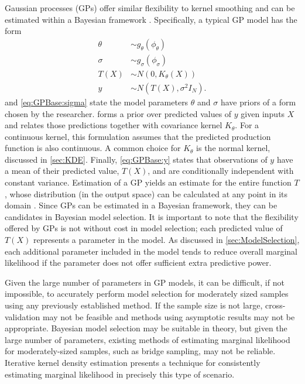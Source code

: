 \documentclass[twocolumn]{article}
\begin{document}
Gaussian processes (GPs) offer similar flexibility to kernel smoothing and can be estimated within a Bayesian framework \citep{Rasmussen}. Specifically, a typical GP model has the form
\begin{subequations}
\begin{align}
	\label{eq:GPBase:theta} \theta &\sim g_\theta(\phi_\theta)\\ 
	\label{eq:GPBase:sigma} \sigma &\sim g_\sigma(\phi_\sigma)\\ 
	\label{eq:GPBase:f} T(X) &\sim N(0, K_\theta(X))\\ 
	\label{eq:GPBase:y} y &\sim N(T(X), \sigma^2 I_N). 
\end{align}
\end{subequations}
 and \cref{eq:GPBase:sigma} state the model parameters $\theta$ and $\sigma$ have priors of a form chosen by the researcher.  forms a prior over predicted values of $y$ given inputs $X$ and relates those predictions together with covariance kernel $K_\theta$. For a continuous kernel, this formulation assumes that the predicted production function is also continuous. A common choice for $K_\theta$ is the normal kernel, discussed in \cref{sec:KDE}. Finally, \cref{eq:GPBase:y} states that observations of $y$ have a mean of their predicted value, $T(X)$, and are conditionally independent with constant variance. Estimation of a GP yields an estimate for the entire function $T$, whose distribution (in the output space) can be calculated at any point in its domain \citep{RasmussenWilliams}. Since GPs can be estimated in a Bayesian framework, they can be candidates in Bayesian model selection. It is important to note that the flexibility offered by GPs is not without cost in model selection; each predicted value of $T(X)$ represents a parameter in the model. As discussed in \cref{sec:ModelSelection}, each additional parameter included in the model tends to reduce overall marginal likelihood if the parameter does not offer sufficient extra predictive power.

Given the large number of parameters in GP models, it can be difficult, if not impossible, to accurately perform model selection for moderately sized samples using any previously established method. If the sample size is not large, cross-validation may not be feasible and methods using asymptotic results may not be appropriate. Bayesian model selection may be suitable in theory, but given the large number of parameters, existing methods of estimating marginal likelihood for moderately-sized samples, such as bridge sampling, may not be reliable. Iterative kernel density estimation presents a technique for consistently estimating marginal likelihood in precisely this type of scenario.
\end{document}
